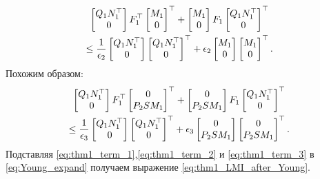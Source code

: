 \begin{multline}
	\label{eq:thm1_term_2}
	\begin{bmatrix}
		{Q}_1{N}_1^\top \\0
	\end{bmatrix}{F}_1^\top\begin{bmatrix}
		{M}_1 \\0
	\end{bmatrix}^\top+\begin{bmatrix}
		{M}_1 \\0
	\end{bmatrix}{F}_1\begin{bmatrix}
		{Q}_1{N}_1^\top \\0
	\end{bmatrix}^\top  \\ \leq \frac{1}{\epsilon_2}\begin{bmatrix}
		{Q}_1{N}_1^\top \\0
	\end{bmatrix}\begin{bmatrix}
		{Q}_1{N}_1^\top \\ 0
	\end{bmatrix}^\top +\epsilon_2 \begin{bmatrix}
		{M}_1 \\0
	\end{bmatrix}\begin{bmatrix}
		{M}_1 \\0
	\end{bmatrix}^\top.
\end{multline}
%
Похожим образом:
%
\begin{multline}
	\label{eq:thm1_term_3}
	\begin{bmatrix}
		{Q}_1{N}_1^\top \\0
	\end{bmatrix}{F}_1^\top\begin{bmatrix}
		0 \\ {P}_2{S}{M}_1
	\end{bmatrix}^\top+\begin{bmatrix}
		0\\ {P}_2{S}{M}_1
	\end{bmatrix}{F}_1\begin{bmatrix}
		{Q}_1{N}_1^\top \\0
	\end{bmatrix}^\top \\ \leq  \frac{1}{\epsilon_3}\begin{bmatrix}
		{Q}_1{N}_1^\top \\0
	\end{bmatrix}\begin{bmatrix}
		{Q}_1{N}_1^\top \\ 0
	\end{bmatrix}^\top +\epsilon_3 \begin{bmatrix}
		0 \\ {P}_2{S}{M}_1
	\end{bmatrix}\begin{bmatrix}
		0 \\ {P}_2{S}{M}_1
	\end{bmatrix}^\top.
\end{multline}
%
Подставляя \eqref{eq:thm1_term_1},\eqref{eq:thm1_term_2} и \eqref{eq:thm1_term_3} в \eqref{eq:Young_expand} получаем выражение \eqref{eq:thm1_LMI_after_Young}.

\clearpage
{}

